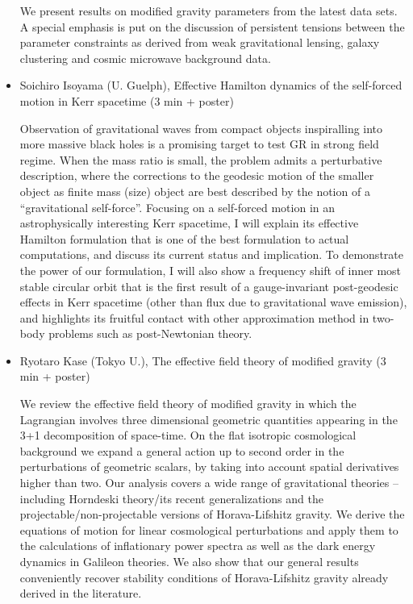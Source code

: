 \documentclass[letterpaper,12pt]{article}
\newcommand{\talk}[2]{{\fontspec{Lato Bold} #1,} {\fontspec{Lato Light Italic} #2}}
\begin{document}
\begin{itemize}
We present results on modified gravity parameters from the latest data sets. A special emphasis is put on the discussion of persistent tensions between the parameter constraints as derived from weak gravitational lensing, galaxy clustering and cosmic microwave background data.

\item \talk{Soichiro Isoyama (U. Guelph)}{Effective Hamilton dynamics of the self-forced motion in Kerr spacetime (3 min + poster)}

Observation of gravitational waves from compact objects inspiralling into more massive black holes is a promising target to test GR in strong field regime. When the mass ratio is small, the problem admits a perturbative description, where the corrections to the geodesic motion of the smaller object as finite mass (size) object are best described by the notion of a ``gravitational self-force''. Focusing on a self-forced motion in an astrophysically interesting Kerr spacetime, I will explain its effective Hamilton formulation that is one of the best formulation to actual computations, and discuss its current status and implication. To demonstrate the power of our formulation, I will also show a frequency shift of inner most stable circular orbit that is the first result of a gauge-invariant post-geodesic effects in Kerr spacetime (other than flux due to gravitational wave emission), and highlights its fruitful contact with other approximation method in two-body problems such as post-Newtonian theory.

\item \talk{Ryotaro Kase (Tokyo U.)}{The effective field theory of modified gravity (3 min + poster)}

We review the effective field theory of modified gravity in which the Lagrangian involves three dimensional geometric quantities appearing in the 3+1 decomposition of space-time. On the flat isotropic cosmological background we expand a general action up to second order in the perturbations of geometric scalars, by taking into account spatial derivatives higher than two. Our analysis covers a wide range of gravitational theories -- including  Horndeski theory/its recent generalizations and the projectable/non-projectable versions of Horava-Lifshitz gravity. We derive the equations of motion for linear cosmological perturbations and apply them to the calculations of inflationary power spectra as well as the dark energy dynamics in Galileon theories. We also show that our general results conveniently 
recover stability conditions of Horava-Lifshitz gravity already derived in the literature.


\end{itemize}
\end{document}
